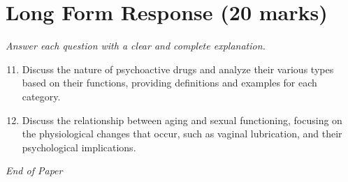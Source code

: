 \documentclass[12pt]{article}
\begin{document}
\section*{Long Form Response (20 marks)}
\textit{Answer each question with a clear and complete explanation.}
\begin{enumerate}[label=\arabic*.]
\setcounter{enumi}{10}
\item Discuss the nature of psychoactive drugs and analyze their various types based on their functions, providing definitions and examples for each category.
\item Discuss the relationship between aging and sexual functioning, focusing on the physiological changes that occur, such as vaginal lubrication, and their psychological implications.
\end{enumerate}

\vfill
\noindent\textit{End of Paper}
\end{document}
